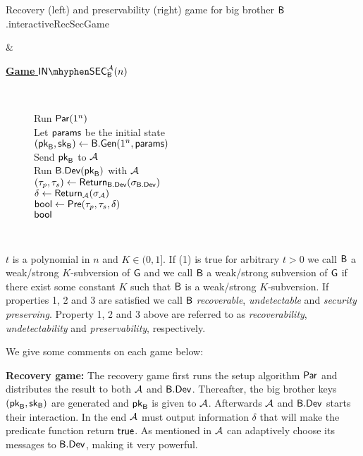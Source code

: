 \begin{defn}
\begin{enumerate}[1.]
\begin{boxfigTwo}{Recovery (left) and preservability (right) game for big brother $\mathsf{B}$.}{interactiveRecSecGame}
\begin{minipage}{0.45\textwidth}
\end{minipage}
    & 
\begin{minipage}{0.45\textwidth}
    \smallskip
	\begin{description}
	\item[\underline{\textbf{Game} $\insecgame_{\bb}^{\adve}(n)$}] ~
 	
 		Run $\operatorname{\mathsf{Par}}(1^n)$ \\
 		Let $\mathsf{params}$ be the initial state \\
 		$(\mathsf{pk}_{\mathsf{B}},\mathsf{sk}_{\mathsf{B}})\leftarrow \mathsf{B}.\mathsf{Gen}(1^n,\mathsf{params})$ \\
 		Send $\mathsf{pk}_{\mathsf{B}}$ to $\mathcal{A}$ \\
 		Run $\mathsf{B}.\mathsf{Dev}(\mathsf{pk}_{\mathsf{B}})$ with $\mathcal{A}$ \\
 		$(\tau_p,\tau_s)\leftarrow \operatorname{\mathsf{Return}}_{\mathsf{B}.\mathsf{Dev}}(\sigma_{\mathsf{B}.\mathsf{Dev}})$ \\	
 		$\delta\leftarrow \operatorname{\mathsf{Return}}_{\mathcal{A}}(\sigma_{\mathcal{A}})$ \\
 		$\mathsf{bool} \leftarrow \operatorname{\mathsf{Pre}}(\tau_p,\tau_s,\delta)$ \\
 		\Ret $\mathsf{bool}$ 
		\smallskip
  	\end{description}
\end{minipage}
\\ 
\end{boxfigTwo}
	\end{enumerate}
$t$ is a polynomial in $n$ and $K\in(0,1]$. If (1) is true for arbitrary $t>0$ we call $\mathsf{B}$ a weak/strong $K$-subversion of $\operatorname{\mathsf{G}}$ and we call $\mathsf{B}$ a weak/strong subversion of $\operatorname{\mathsf{G}}$ if there exist some constant $K$ such that $\mathsf{B}$ is a weak/strong $K$-subversion. If properties 1, 2 and 3 are satisfied we call $\mathsf{B}$ \emph{recoverable}, \emph{undetectable} and \emph{security preserving}. Property 1, 2 and 3 above are referred to as \emph{recoverability}, \emph{undetectability} and \emph{preservability}, respectively.
\end{defn}

We give some comments on each game below:

\noindent\textbf{Recovery game:} The recovery game first runs the setup algorithm $\operatorname{\mathsf{Par}}$ and distributes the result to both $\mathcal{A}$ and $\mathsf{B}.\mathsf{Dev}$. Thereafter, the big brother keys $(\mathsf{pk}_{\mathsf{B}},\mathsf{sk}_{\mathsf{B}})$ are generated and $\mathsf{pk}_{\mathsf{B}}$ is given to $\mathcal{A}$. Afterwards $\mathcal{A}$ and $\mathsf{B}.\mathsf{Dev}$ starts their interaction. In the end $\mathcal{A}$ must output information $\delta$ that will make the predicate function return $\mathsf{true}$. As mentioned in  $\mathcal{A}$ can adaptively choose its messages to $\mathsf{B}.\mathsf{Dev}$, making it very powerful. 

